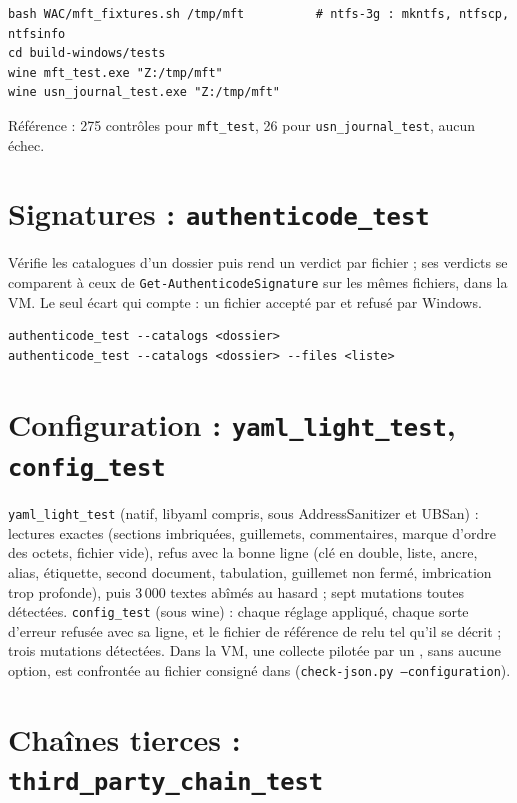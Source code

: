 \documentclass[11pt,a4paper,oneside]{report}
\begin{document}
\begin{lstlisting}
bash WAC/mft_fixtures.sh /tmp/mft          # ntfs-3g : mkntfs, ntfscp, ntfsinfo
cd build-windows/tests
wine mft_test.exe "Z:/tmp/mft"
wine usn_journal_test.exe "Z:/tmp/mft"
\end{lstlisting}

Référence : 275 contrôles pour \texttt{mft\_test}, 26 pour
\texttt{usn\_journal\_test}, aucun échec.

\section{Signatures : \texttt{authenticode\_test}}

Vérifie les catalogues d'un dossier puis rend un verdict par fichier ; ses
verdicts se comparent à ceux de \texttt{Get-AuthenticodeSignature} sur les mêmes
fichiers, dans la VM. Le seul écart qui compte : un fichier accepté par \wac{}
et refusé par Windows.

\begin{lstlisting}
authenticode_test --catalogs <dossier>
authenticode_test --catalogs <dossier> --files <liste>
\end{lstlisting}

\section{Configuration : \texttt{yaml\_light\_test}, \texttt{config\_test}}

\texttt{yaml\_light\_test} (natif, libyaml compris, sous AddressSanitizer et
UBSan) : lectures exactes (sections imbriquées, guillemets, commentaires,
marque d'ordre des octets, fichier vide), refus avec la bonne ligne (clé en
double, liste, ancre, alias, étiquette, second document, tabulation, guillemet
non fermé, imbrication trop profonde), puis 3\,000 textes abîmés au hasard ;
sept mutations toutes détectées. \texttt{config\_test} (sous wine) : chaque
réglage appliqué, chaque sorte d'erreur refusée avec sa ligne, et le fichier
de référence de  relu tel qu'il se décrit ; trois mutations
détectées. Dans la VM, une collecte pilotée par un , sans
aucune option, est confrontée au fichier consigné dans
 (\texttt{check-json.py --configuration}).

\section{Chaînes tierces : \texttt{third\_party\_chain\_test}}
\end{document}
